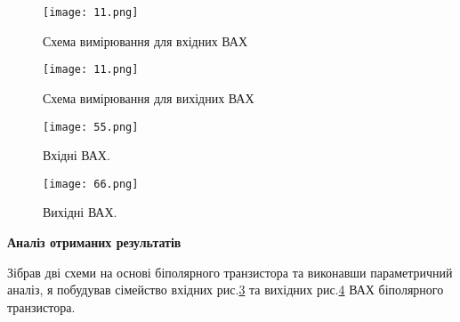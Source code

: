 \documentclass[a4paper,14pt]{extreport}
\begin{document}
\begin{figure}[h]
\begin{center}
\texttt{[image: 11.png]}
\caption{Схема вимірювання для вхідних ВАХ}
\label{ris111}
\end{center}
\end{figure}



\begin{figure}[h]
\begin{center}
\texttt{[image: 11.png]}
\caption{Схема вимірювання для вихідних ВАХ}
\label{ris111}
\end{center}
\end{figure}







\begin{figure}[h]
\begin{center}
\texttt{[image: 55.png]}
\caption{Вхідні ВАХ.}
\label{ris111}
\end{center}
\end{figure}

\begin{figure}[h]
\begin{center}
\texttt{[image: 66.png]}
\caption{Вихідні ВАХ.}
\label{ris222}
\end{center}
\end{figure}

\clearpage
\newpage
\begin{center}\textbf{Аналіз отриманих результатів} \end{center}

Зібрав дві схеми на основі біполярного транзистора та виконавши параметричний аналіз, я побудував сімейство вхідних рис.\ref{ris111} та вихідних рис.\ref{ris222} ВАХ біполярного транзистора.
\end{document}
